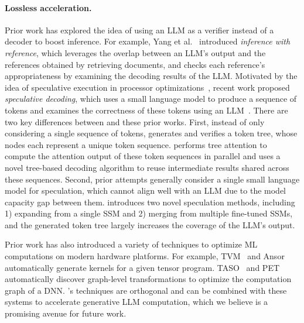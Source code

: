 \paragraph{Lossless acceleration.}
Prior work has explored the idea of using an LLM as a verifier instead of a decoder to boost inference.
For example, Yang et al.~\cite{yang2023inference} introduced {\em inference with reference}, which leverages the overlap between an LLM's output and the references obtained by retrieving documents, and checks each reference's appropriateness by examining the decoding results of the LLM.
Motivated by the idea of speculative execution in processor optimizations~\cite{burton1985speculative,hennessy2011computer}, recent work proposed {\em speculative decoding}, which uses a small language model to produce a sequence of tokens and examines the correctness of these tokens using an LLM~\cite{leviathan2022fast,xiaspeculative,stern2018blockwise,chen2023accelerating,gante2023assisted}.
There are two key differences between \SpecInfer and these prior works.
First, instead of only considering a single sequence of tokens, \SpecInfer generates and verifies a token tree, whose nodes each represent a unique token sequence. \SpecInfer performs tree attention to compute the attention output of these token sequences in parallel and uses a novel tree-based decoding algorithm to reuse intermediate results shared across these sequences.
Second, prior attempts generally consider a single small language model for speculation, which cannot align well with an LLM due to the model capacity gap between them.
\SpecInfer introduces two novel speculation methods, including 1) expanding from a single SSM and 2) merging from multiple fine-tuned SSMs, and the generated token tree largely increases the coverage of the LLM's output.

Prior work has also introduced a variety of techniques to optimize ML computations on modern hardware platforms.
For example, TVM~\cite{chen2018tvm} and Ansor~\cite{zheng2020ansor} automatically generate kernels for a given tensor program. TASO~\cite{jia2019taso} and PET~\cite{wang2021pet} automatically discover graph-level transformations to optimize the computation graph of a DNN.
\SpecInfer's techniques are orthogonal and can be combined with these systems to accelerate generative LLM computation, which we believe is a promising avenue for future work.

